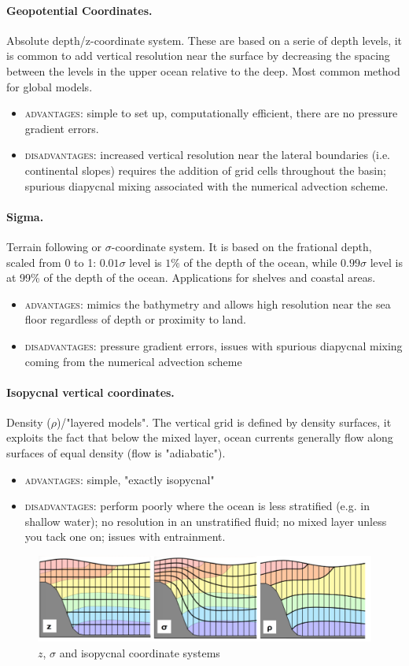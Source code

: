 \paragraph{Geopotential Coordinates.} Absolute depth/z-coordinate system. These are based on a serie of depth levels, it is common to add vertical resolution near the surface by decreasing the spacing between the levels in the upper ocean relative to the deep. Most common method for global models.
\begin{itemize}
	\item \textsc{advantages}: simple to set up, computationally efficient, there are no pressure gradient errors.
	\item \textsc{disadvantages}: increased vertical resolution near the lateral boundaries (i.e. continental slopes) requires the addition of grid cells throughout the basin; spurious diapycnal mixing associated with the numerical advection scheme.
\end{itemize}
\paragraph{Sigma.} Terrain following or $\sigma$-coordinate system. It is based on the frational depth, scaled from 0 to 1: $0.01\sigma$ level is $1\%$ of the depth of the ocean, while $0.99\sigma$ level is at 99\% of the depth of the ocean. Applications for shelves and coastal areas.
\begin{itemize}
	\item \textsc{advantages}: mimics the bathymetry and allows high resolution near the sea floor regardless of depth or proximity to land.
	\item \textsc{disadvantages}: pressure gradient errors, issues with spurious diapycnal mixing coming from the numerical advection scheme
\end{itemize}
\paragraph{Isopycnal vertical coordinates.} Density ($\rho$)/"layered models". The vertical grid is defined by density surfaces, it exploits the fact that below the mixed layer, ocean currents generally flow along surfaces of equal density (flow is "adiabatic").
\begin{itemize}
	\item \textsc{advantages}: simple, "exactly isopycnal"
	\item \textsc{disadvantages}: perform poorly where the ocean is less stratified (e.g. in shallow water); no resolution in an unstratified fluid; no mixed layer unless you tack one on; issues with entrainment.
\end{itemize}
\begin{figure}[h!]
	\centering
	\includegraphics[width=0.5\linewidth]{uploads/Screenshot 2024-11-22 001323.png}
	\caption{$z$, $\sigma$ and isopycnal coordinate systems}
	\label{fig:enter-label}
\end{figure}
